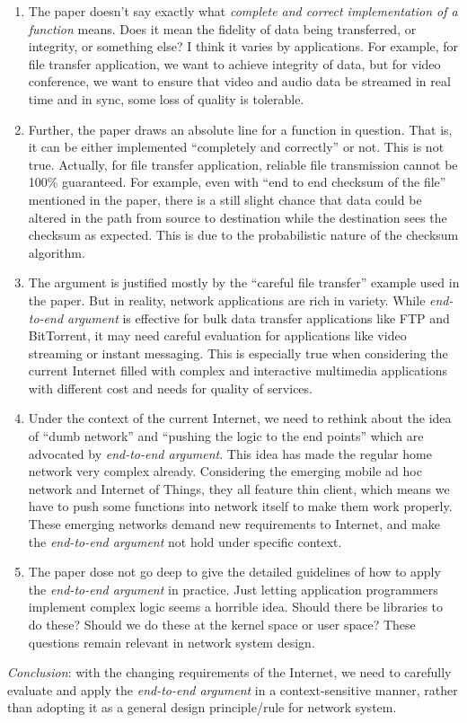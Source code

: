 \documentclass[11pt]{article}
\begin{document}
\begin{enumerate}
\item The paper doesn't say exactly what \emph{complete and
  correct implementation of a function} means. Does it mean the
  fidelity of data being transferred, or integrity, or something else?
  I think it varies by applications. For example, for file transfer
  application, we want to achieve integrity of data, but for video
  conference, we want to ensure that video and audio data be
  streamed in real time and in sync, some loss of quality is
  tolerable. 
\item Further, the paper draws an absolute line for a function in
  question. That is, it can be either implemented ``completely and
  correctly'' or not. This is not true. Actually, for file transfer
  application, reliable file transmission 
  cannot be 100\% guaranteed. For example, even with ``end
  to end checksum of the file'' mentioned in the paper, there is a
  still slight chance that data could be altered in the path from
  source to destination while the destination sees the checksum as
  expected. This is due to the probabilistic nature of the checksum
  algorithm. 
\item The argument is justified mostly by the ``careful file
  transfer'' example used in the paper. But in reality, network
  applications are rich in variety. While \emph{end-to-end argument}
  is effective for bulk data transfer applications like FTP and
  BitTorrent, it may need careful evaluation for applications like
  video streaming or instant messaging. This is especially true when
  considering the current Internet filled with complex and interactive
  multimedia applications with different cost and needs for quality of
  services.
\item Under the context of the current Internet, we need to rethink
  about the idea of ``dumb network'' and ``pushing the logic to the end
  points'' which are advocated by \emph{end-to-end argument}. This
  idea has made the regular home network very complex 
  already. Considering the emerging mobile ad hoc network and Internet
  of Things, 
  they all feature thin client, which means we have to push some functions
  into network itself to make them work properly. These emerging
  networks demand new requirements to Internet, and make the
  \emph{end-to-end argument} not hold under specific context.
\item The paper dose not go deep to give the detailed guidelines of
  how to apply 
  the \emph{end-to-end argument} in practice. Just letting application
  programmers implement complex logic seems a horrible idea. Should
  there be libraries to do these? Should we do these at the kernel space
  or user space? These questions remain relevant in network system
  design.
\end{enumerate}

\emph{Conclusion}: with the changing requirements of the Internet, we
need to 
carefully evaluate and apply the \emph{end-to-end argument} in a
context-sensitive manner, rather than adopting it as a general design
principle/rule for network system.
\end{document}
